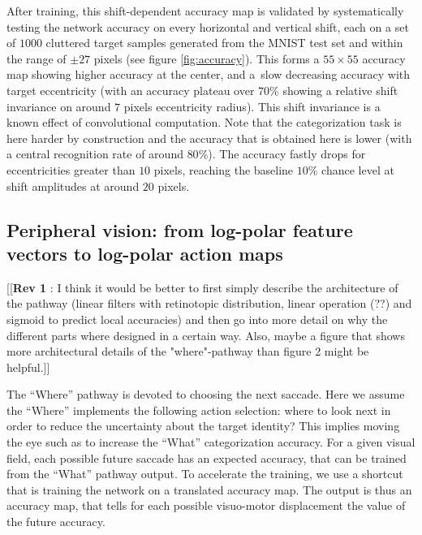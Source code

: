 After training, this shift-dependent accuracy map is validated by systematically testing the network accuracy on every horizontal and vertical shift, each on a set of $1000$ cluttered target samples generated from the MNIST test set and within the range of $\pm 27$ pixels (see figure \ref{fig:accuracy}).  This forms a $55\times 55$ accuracy map showing higher accuracy at the center, and a slow decreasing accuracy with target eccentricity (with an accuracy plateau  over $70\%$ showing a relative shift invariance on around $7$ pixels eccentricity radius). This shift invariance is a known effect of convolutional computation. Note that the categorization task is here harder by construction and the accuracy that is obtained here is lower (with a central recognition rate of around $80\%$). The accuracy fastly drops for eccentricities  greater than $10$ pixels, reaching the baseline $10\%$ chance level at shift amplitudes at around $20$ pixels.

\subsection*{Peripheral vision: from log-polar feature vectors to log-polar action maps}
%
%
%
{\color{magenta} [[\textbf{Rev 1} : I think it would be better to first simply describe the architecture of the pathway (linear filters with retinotopic distribution, linear operation (??) and sigmoid to predict local accuracies) and then go into more detail on why the different parts where designed in a certain way. Also, maybe a figure that shows more architectural details of the "where"-pathway than figure 2 might be helpful.]]}

The ``Where'' pathway is devoted to choosing the next saccade.
Here we assume the ``Where'' implements the following action selection: where to look next in order to reduce the uncertainty about the target identity? This implies moving the eye such as to increase the ``What'' categorization accuracy. For a given visual field, each possible future saccade has an expected accuracy, that can be trained from the ``What'' pathway output. To accelerate the training, we use a shortcut that is training the network on a translated accuracy map. The output is thus an accuracy map, that tells for each possible visuo-motor displacement the value of the future accuracy.

